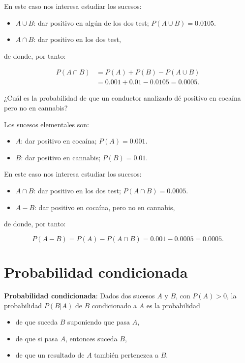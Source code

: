 \documentclass[
  letterpaper,
  DIV=11,
  numbers=noendperiod]{scrreprt}
\providecommand{\tightlist}{%
  \setlength{\itemsep}{0pt}\setlength{\parskip}{0pt}}\usepackage{longtable,booktabs,array}
\begin{document}
En este caso nos interesa estudiar los sucesos:

\begin{itemize}
\tightlist
\item
  \(A\cup B\): dar positivo en algún de los dos test;
  \(P(A\cup B)=0.0105\).
\item
  \(A\cap B\): dar positivo en los dos test,
\end{itemize}

de donde, por tanto:

\[\begin{array}{rl}
{P(A\cap B)} &{=P(A)+P(B)-P(A\cup B)}\\ &{=0.001+0.01-0.0105=0.0005}.
\end{array}\]

¿Cuál es la probabilidad de que un conductor analizado dé positivo en
cocaína pero no en cannabis?

Los sucesos elementales son:

\begin{itemize}
\tightlist
\item
  \(A\): dar positivo en cocaína; \(P(A)=0.001\).
\item
  \(B\): dar positivo en cannabis; \(P(B)=0.01\).
\end{itemize}

En este caso nos interesa estudiar los sucesos:

\begin{itemize}
\tightlist
\item
  \(A\cap B\): dar positivo en los dos test; \(P(A\cap B)=0.0005\).
\item
  \(A-B\): dar positivo en cocaína, pero no en cannabis,
\end{itemize}

de donde, por tanto:

\[P(A-B) =P(A)-P(A\cap B) =0.001-0.0005=0.0005.\]

\hypertarget{probabilidad-condicionada}{%
\section{Probabilidad condicionada}\label{probabilidad-condicionada}}

\textbf{Probabilidad condicionada}: Dados dos sucesos \(A\) y \(B\), con
\(P(A)>0\), la probabilidad \(P(B|A)\) de \(B\) condicionado a \(A\) es
la probabilidad

\begin{itemize}
\tightlist
\item
  de que suceda \(B\) suponiendo que pasa \(A\),
\item
  de que si pasa \(A\), entonces suceda \(B\),
\item
  de que un resultado de \(A\) también pertenezca a \(B\).
\end{itemize}
\end{document}
